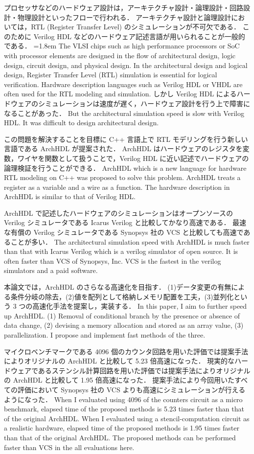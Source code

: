 プロセッサなどのハードウェア設計は，アーキテクチャ設計・論理設計・回路設計・物理設計といったフローで行われる．
アーキテクチャ設計と論理設計においては，RTL (Register Transfer Level) のシミュレーションが不可欠である．
このために Verilog HDL などのハードウェア記述言語が用いられることが一般的である．
\fi
\parindent=1.8em
The VLSI chips such as high performance processors or SoC with processor elements are designed in the flow of architectural design,
logic design, circuit design, and physical design.
In the architectural design and logical design, Register Transfer Level (RTL) simulation is essential for logical verification.
Hardware description languages such as Verilog HDL or VHDL are often used for the RTL modeling and simulation.
しかし Verilog HDL によるハードウェアのシミュレーションは速度が遅く，ハードウェア設計を行う上で障害になることがあった．
\fi
But the architectural simulation speed is slow with Verilog HDL. It was difficult to design architectural design.

この問題を解決することを目標に C++ 言語上で RTL モデリングを行う新しい言語である ArchHDL が提案された．
ArchHDL はハードウェアのレジスタを変数，ワイヤを関数として扱うことで，Verilog HDL に近い記述でハードウェアの論理検証を行うことができる．
\fi
ArchHDL which is a new language for hardware RTL modeling on C++ was proposed to solve this problem.
ArchHDL treats a register as a variable and a wire as a function.
The hardware description in ArchHDL is similar to that of Verilog HDL.

ArchHDL で記述したハードウェアのシミュレーションはオープンソースの Verilog シミュレータである Icarus Verilog と比較してかなり高速である．
最速な有償の Verilog シミュレータである Synopsys 社の VCS と比較しても高速であることが多い．
\fi
The architectural simulation speed with ArchHDL is much faster than
that with Icarus Verilog which is a verilog simulator of open source.
It is often faster than VCS of Synopsys, Inc.
VCS is the fastest in the verilog simulators and a paid software.

本論文では，ArchHDL のさらなる高速化を目指す．
(1)データ変更の有無による条件分岐の除去，(2)値を配列として格納しメモリ配置を工夫，(3)並列化という 3 つの高速化手法を提案し，実装する．
\fi
In this paper, I aim to further speed up ArchHDL.
(1) Removal of conditional branch by the presence or absence of data change,
(2) devising a memory allocation and stored as an array value,
(3) parallelization.
I propose and implement fast methods of the three.

マイクロベンチマークである 4096 個のカウンタ回路を用いた評価では提案手法によりオリジナルの ArchHDL と比較して 5.23 倍高速になった．
現実的なハードウェアであるステンシル計算回路を用いた評価では提案手法によりオリジナルの ArchHDL と比較して 1.95 倍高速になった．
提案手法により今回用いたすべての評価において Synopsys 社の VCS よりも高速にシミュレーションが行えるようになった．
\fi
When I evaluated using 4096 of the counters circuit as a micro benchmark,
elapsed time of the proposed methods is 5.23 times faster than that of the original ArchHDL.
When I evaluated using a stencil-computation circuit as a realistic hardware,
elapsed time of the proposed methods is 1.95 times faster than that of the original ArchHDL.
The proposed methods can be performed faster than VCS in the all evaluations here.